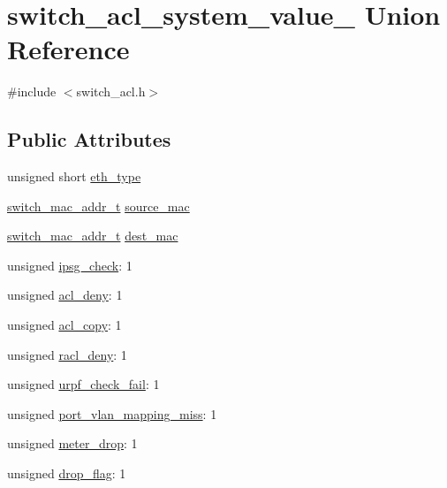 \hypertarget{unionswitch__acl__system__value__}{\section{switch\+\_\+acl\+\_\+system\+\_\+value\+\_\+ Union Reference}
\label{unionswitch__acl__system__value__}
}


{\ttfamily \#include $<$switch\+\_\+acl.\+h$>$}

\subsection*{Public Attributes}
\begin{DoxyCompactItemize}
\item 
unsigned short \hyperlink{unionswitch__acl__system__value___a1d23d60d9359ed737cdd9f51ffa37acd}{eth\+\_\+type}
\item 
\hyperlink{structswitch__mac__addr__s}{switch\+\_\+mac\+\_\+addr\+\_\+t} \hyperlink{unionswitch__acl__system__value___a76c62516ab63f85d45f3e6cf18049f89}{source\+\_\+mac}
\item 
\hyperlink{structswitch__mac__addr__s}{switch\+\_\+mac\+\_\+addr\+\_\+t} \hyperlink{unionswitch__acl__system__value___ab06089019d3617986a0a1973526cac2d}{dest\+\_\+mac}
\item 
unsigned \hyperlink{unionswitch__acl__system__value___a6eb445348b1dc9146f06825ad8fa471c}{ipsg\+\_\+check}\+: 1
\item 
unsigned \hyperlink{unionswitch__acl__system__value___ab329e332db1219f454fb07809eb754f3}{acl\+\_\+deny}\+: 1
\item 
unsigned \hyperlink{unionswitch__acl__system__value___aa4c0ea05c81c0463955ff5858a04187f}{acl\+\_\+copy}\+: 1
\item 
unsigned \hyperlink{unionswitch__acl__system__value___a4ffecd47cc2bfa9441046803bf126877}{racl\+\_\+deny}\+: 1
\item 
unsigned \hyperlink{unionswitch__acl__system__value___a469b9b32cdc59ea35cd0247d57aa63ac}{urpf\+\_\+check\+\_\+fail}\+: 1
\item 
unsigned \hyperlink{unionswitch__acl__system__value___a6b3d8951ac8fdb070c2642d081ff9e09}{port\+\_\+vlan\+\_\+mapping\+\_\+miss}\+: 1
\item 
unsigned \hyperlink{unionswitch__acl__system__value___a59188b1795cbd4db9fde1e9f48c3a4f0}{meter\+\_\+drop}\+: 1
\item 
unsigned \hyperlink{unionswitch__acl__system__value___a1552157439ec21c527248f7bad8976bb}{drop\+\_\+flag}\+: 1

\end{DoxyCompactItemize}
